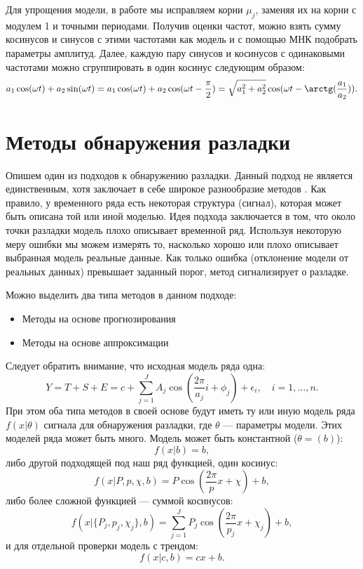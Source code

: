 \documentclass[%
12pt,
master,  %
natbib,      %
subf,        %
substylefile = spbu.rtx,
href,        %
colorlinks,  %
]{disser}
\begin{document}
Для упрощения модели, в работе мы исправляем корни $\mu_j$, заменяя их на корни с модулем 1 и точными периодами. Получив оценки частот, можно взять сумму косинусов и синусов с этими частотами как модель и с помощью МНК подобрать параметры амплитуд. Далее, каждую пару синусов и косинусов с одинаковыми частотами можно сгруппировать в один косинус следующим образом:
\begin{equation*}
a_1 \cos(\omega t) + a_2 \sin(\omega t) = a_1 \cos(\omega t) + a_2 \cos(\omega t - \frac{\pi}{2}) = \sqrt{a_1^2 + a_2^2} \cos(\omega t - \arctg(\frac{a_1}{a_2}) ).
\end{equation*}


\section{Методы обнаружения разладки}


Опишем один из подходов к обнаружению разладки. Данный подход не является единственным, хотя заключает в себе широкое разнообразие методов \cite{cp_disser,ruptures}. Как правило, у временного ряда есть некоторая структура (сигнал), которая может быть описана той или иной моделью. Идея подхода заключается в том, что около точки разладки модель плохо описывает временной ряд. Используя некоторую меру ошибки мы можем измерять то, насколько хорошо или плохо описывает выбранная модель реальные данные. Как только ошибка (отклонение модели от реальных данных) превышает заданный порог, метод сигнализирует о разладке.

Можно выделить два типа методов в данном подходе:
\begin{itemize}
	\item Методы на основе прогнозирования
	\item Методы на основе аппроксимации
\end{itemize}

Следует обратить внимание, что исходная модель ряда одна:
\begin{equation*}
Y = T + S + E = c + \sum_{j=1}^{J}{A_j \cos \left( \frac{2\pi}{a_j} i + \phi_j \right)} + \epsilon_i, \quad i = 1, \dots, n.
\end{equation*}
При этом оба типа методов в своей основе будут иметь ту или иную модель ряда $f(x|\theta)$ сигнала для обнаружения разладки, где $\theta$ --- параметры модели. Этих моделей ряда может быть много.
Модель может быть константной ($\theta = (b)$):
\begin{equation*}
f(x | b) = b,
\end{equation*}
либо другой подходящей под наш ряд функцией, один косинус:
\begin{equation*}
f(x | P, p, \chi, b) = P\cos(\frac{2\pi}{p}x + \chi) + b,
\end{equation*}
либо более сложной функцией --- суммой косинусов:
\begin{equation*}
f(x | \{P_j, p_j, \chi_j\}, b) = \sum_{j=1}^JP_j\cos(\frac{2\pi}{p_j}x + \chi_j) + b,
\end{equation*}
и для отдельной проверки модель с трендом:
\begin{equation*}
f(x | c, b) = cx + b.
\end{equation*}
\end{document}
